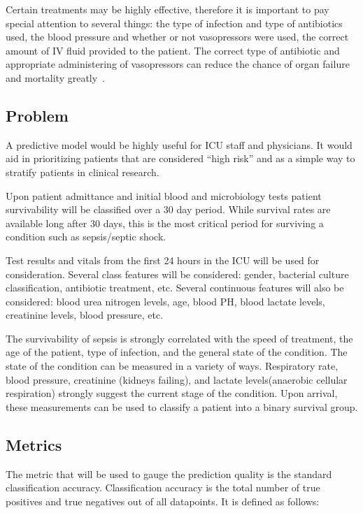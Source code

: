 \documentclass[11pt]{article}
\begin{document}
	Certain treatments may be highly effective, therefore it is important to pay special attention to several things: the type of infection and type of antibiotics used, the blood pressure and whether or not vasopressors were used, the correct amount of IV fluid provided to the patient. The correct type of antibiotic and appropriate administering of vasopressors can reduce the chance of organ failure and mortality greatly~\cite{pressors}.
	
	
	\subsection{Problem}
	
	A predictive model would be highly useful for ICU staff and physicians. It would aid in prioritizing patients that are considered ``high risk'' and as a simple way to stratify patients in clinical research. 
	
	Upon patient admittance and initial blood and microbiology tests patient survivability will be classified over a 30 day period. While survival rates are available long after 30 days, this is the most critical period for surviving a condition such as sepsis/septic shock. 
	
	Test results and vitals from the first 24 hours in the ICU will be used for consideration. Several class features will be considered: gender, bacterial culture classification, antibiotic treatment, etc. Several continuous features will also be considered: blood urea nitrogen levels, age, blood PH, blood lactate levels, creatinine levels, blood pressure, etc.
	
	The survivability of sepsis is strongly correlated with the speed of treatment, the age of the patient, type of infection, and the general state of the condition. The state of the condition can be measured in a variety of ways. Respiratory rate, blood pressure, creatinine (kidneys failing), and lactate levels(anaerobic cellular respiration) strongly suggest the current stage of the condition. Upon arrival, these measurements can be used to classify a patient into a binary survival group.
	
	\subsection{Metrics}
	The metric that will be used to gauge the prediction quality is the standard classification accuracy. Classification accuracy is the total number of true positives and true negatives out of all datapoints. It is defined as follows:
	
\end{document}
